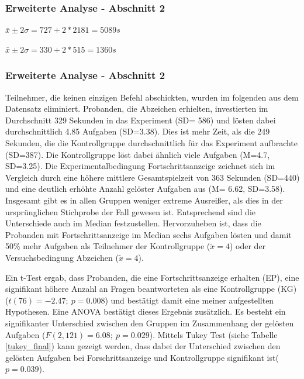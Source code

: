\subsubsection{Erweiterte Analyse - Abschnitt 2}

$\bar{x}\pm 2\sigma = 727 + 2*2181 = 5089 s$ 

$\bar{x}\pm 2\sigma = 330 + 2*515 = 1360 s$ 


\subsubsection{Erweiterte Analyse - Abschnitt 2}
Teilnehmer, die keinen einzigen Befehl abschickten, wurden im folgenden aus dem Datensatz eliminiert.
Probanden, die Abzeichen erhielten, investierten im Durchschnitt 329 Sekunden in das Experiment (SD= 586) und lösten dabei durchschnittlich 4.85 Aufgaben (SD=3.38). Dies ist mehr Zeit, als die 249 Sekunden, die die Kontrollgruppe durchschnittlich für das Experiment aufbrachte (SD=387). Die Kontrollgruppe löst dabei ähnlich viele Aufgaben (M=4.7, SD=3.25). Die Experimentalbedingung Fortschrittsanzeige zeichnet sich im Vergleich durch eine höhere mittlere Gesamtspielzeit von 363 Sekunden (SD=440) und eine deutlich erhöhte Anzahl gelöster Aufgaben aus (M= 6.62, SD=3.58). Insgesamt gibt es in allen Gruppen weniger extreme Ausreißer, als dies in der ursprünglichen Stichprobe der Fall gewesen ist. Entsprechend sind die Unterschiede auch im Median festzustellen. Hervorzuheben ist, dass die Probanden mit Fortschrittsanzeige im Median sechs Aufgaben lösten und damit 50\% mehr Aufgaben als Teilnehmer der Kontrollgruppe ($\tilde x = 4$) oder der Versuchsbedingung Abzeichen ($\tilde x = 4$).

Ein t-Test ergab, dass Probanden, die eine Fortschrittsanzeige erhalten (EP), eine signifikant höhere Anzahl an Fragen beantworteten als eine Kontrollgruppe (KG) ($t(76)=-2.47;\: p=0.008$) und bestätigt damit eine meiner aufgestellten Hypothesen. Eine ANOVA bestätigt dieses Ergebnis zusätzlich. Es besteht ein signifikanter Unterschied zwischen den Gruppen im Zusammenhang der gelösten Aufgaben ($F(2,121)=6.08;\: p=0.029$). Mittels Tukey Test (siehe Tabelle \ref{tukey_final}) kann gezeigt werden, dass dabei der Unterschied zwischen den gelösten Aufgaben bei Forschrittsanzeige und Kontrollgruppe signifikant ist($p=0.039$).

